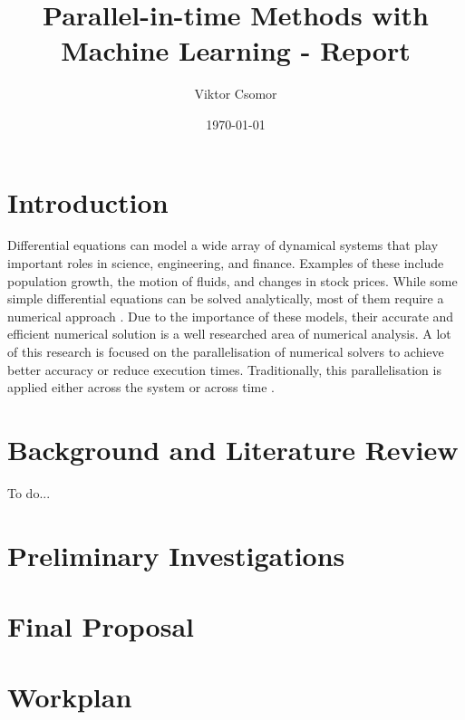 \documentclass{article}
\begin{document}

\title{Parallel-in-time Methods with Machine Learning - Report}
\author{Viktor Csomor}
\date{\today}

\makeEPCCtitle

\newpage

\tableofcontents

\newpage
{}

\section{Introduction}

Differential equations can model a wide array of dynamical systems that play important roles in science, engineering, and finance. Examples of these include population growth, the motion of fluids, and changes in stock prices. While some simple differential equations can be solved analytically, most of them require a numerical approach \cite[p.~310]{suli2003}. Due to the importance of these models, their accurate and efficient numerical solution is a well researched area of numerical analysis. A lot of this research is focused on the parallelisation of numerical solvers to achieve better accuracy or reduce execution times. Traditionally, this parallelisation is applied either across the system or across time \cite{gear1988}.

\section{Background and Literature Review}

To do...

\section{Preliminary Investigations}



\section{Final Proposal}



\section{Workplan}
\end{document}
